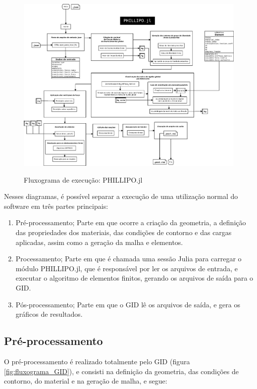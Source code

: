 \begin{figure}[hbtp]
    \centering
    \caption{Fluxograma de execução: PHILLIPO.jl}
    \includegraphics[width = \textwidth]{Figuras/fluxograma_PHILLIPO.pdf}
    \label{fig:fluxograma_PHILLIPO}
\end{figure}

Nesses diagramas, é possível separar a execução de uma utilização normal do software em três partes principais:

\begin{enumerate}
    \item Pré-processamento;
        Parte em que ocorre a criação da geometria, a definição das propriedades dos materiais, das condições de contorno e das cargas aplicadas, assim como a geração da malha e elementos.
    \item Processamento;
        Parte em que é chamada uma sessão Julia para carregar o módulo PHILLIPO.jl, que é responsável por ler os arquivos de entrada, e executar o algoritmo de elementos finitos, gerando os arquivos de saída para o GID.
    \item Pós-processamento;
        Parte em que o GID lê os arquivos de saída, e gera os gráficos de resultados.
\end{enumerate}

\subsection{Pré-processamento}

O pré-processamento é realizado totalmente pelo GID (figura \ref{fig:fluxograma_GID}), e consisti na definição da geometria, das condições de contorno, do material e na geração de malha, e segue:

